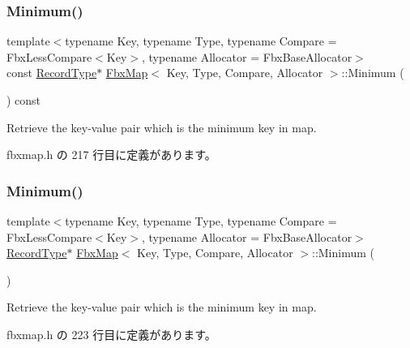 \subsubsection{\texorpdfstring{Minimum()}{Minimum()}\hspace{0.1cm}{\footnotesize\ttfamily [1/2]}}
{\footnotesize\ttfamily template$<$typename Key, typename Type, typename Compare = Fbx\+Less\+Compare$<$\+Key$>$, typename Allocator = Fbx\+Base\+Allocator$>$ \\
const \hyperlink{class_fbx_map_af8fc887461b3bf29f41aa36d15ddb54f}{Record\+Type}$\ast$ \hyperlink{class_fbx_map}{Fbx\+Map}$<$ Key, Type, Compare, Allocator $>$\+::Minimum (\begin{DoxyParamCaption}{ }\end{DoxyParamCaption}) const\hspace{0.3cm}{\ttfamily [inline]}}



Retrieve the key-\/value pair which is the minimum key in map. 



 fbxmap.\+h の 217 行目に定義があります。

\mbox{\label{class_fbx_map_a5ea3f42780e9896b0503f9a67ee8607e}} 
\subsubsection{\texorpdfstring{Minimum()}{Minimum()}\hspace{0.1cm}{\footnotesize\ttfamily [2/2]}}
{\footnotesize\ttfamily template$<$typename Key, typename Type, typename Compare = Fbx\+Less\+Compare$<$\+Key$>$, typename Allocator = Fbx\+Base\+Allocator$>$ \\
\hyperlink{class_fbx_map_af8fc887461b3bf29f41aa36d15ddb54f}{Record\+Type}$\ast$ \hyperlink{class_fbx_map}{Fbx\+Map}$<$ Key, Type, Compare, Allocator $>$\+::Minimum (\begin{DoxyParamCaption}{ }\end{DoxyParamCaption})\hspace{0.3cm}{\ttfamily [inline]}}



Retrieve the key-\/value pair which is the minimum key in map. 



 fbxmap.\+h の 223 行目に定義があります。

\mbox{\label{class_fbx_map_a2c0f757eed20687c6b8fd3339c0f35ce}} 
